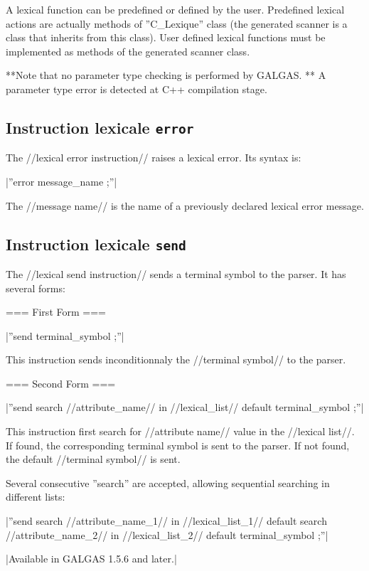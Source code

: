 A lexical function can be predefined or defined by the user. Predefined lexical actions are actually methods of ''C\_Lexique'' class (the generated scanner is a class that inherits from this class). User defined lexical functions must be implemented as methods of the generated scanner class.

**Note that no parameter type checking is performed by GALGAS. ** A parameter type error is detected at C++ compilation stage.
 
\subsection{Instruction lexicale \texttt{error}}

The //lexical error instruction// raises a lexical error. Its syntax is:

|''error message\_name ;''|

The //message name// is the name of a previously declared lexical error message.

\subsection{Instruction lexicale \texttt{send}}

The //lexical send instruction// sends a terminal symbol to the parser. It has several forms:

=== First Form ===

|''send terminal\_symbol ;''|

This instruction sends inconditionnaly the //terminal symbol// to the parser.

=== Second Form ===

|''send search //attribute\_name// in //lexical\_list// default terminal\_symbol ;''|

This instruction first search for //attribute name// value in the //lexical list//. If found, the corresponding terminal symbol is sent to the parser. If not found, the default //terminal symbol// is sent.

Several consecutive ''search'' are accepted, allowing sequential searching in different lists:

|''send search //attribute\_name\_1// in //lexical\_list\_1// default search //attribute\_name\_2// in //lexical\_list\_2// default terminal\_symbol ;''|


|Available in GALGAS 1.5.6 and later.|


